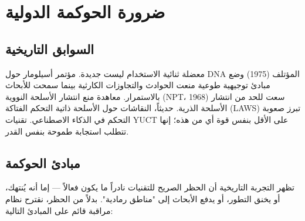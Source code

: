 \documentclass[12pt,a4paper]{article}
\theoremstyle{remark}
\begin{document}
	\section{ضرورة الحوكمة الدولية}
	\label{sec:governance}
	
	\subsection{السوابق التاريخية}
	\label{subsec:precedents}
	
	معضلة ثنائية الاستخدام ليست جديدة. مؤتمر أسيلومار حول DNA المؤتلف (1975) وضع مبادئ توجيهية طوعية منعت الحوادث والتجاوزات الكارثية بينما سمحت للأبحاث بالاستمرار. معاهدة منع انتشار الأسلحة النووية (NPT، 1968) سعت للحد من انتشار الأسلحة الذرية. حديثاً، النقاشات حول الأسلحة ذاتية التحكم الفتاكة (LAWS) تبرز صعوبة التحكم في الذكاء الاصطناعي. تقنيات YUCT على الأقل بنفس قوة أي من هذه؛ إنها تتطلب استجابة طموحة بنفس القدر.
	
	\subsection{مبادئ الحوكمة}
	\label{subsec:principles}
	
	تظهر التجربة التاريخية أن الحظر الصريح للتقنيات نادراً ما يكون فعالاً — إما أنه يُنتهك، أو يخنق التطور، أو يدفع الأبحاث إلى "مناطق رمادية". بدلاً من الحظر، نقترح نظام مراقبة قائم على المبادئ التالية:
	
\end{document}
